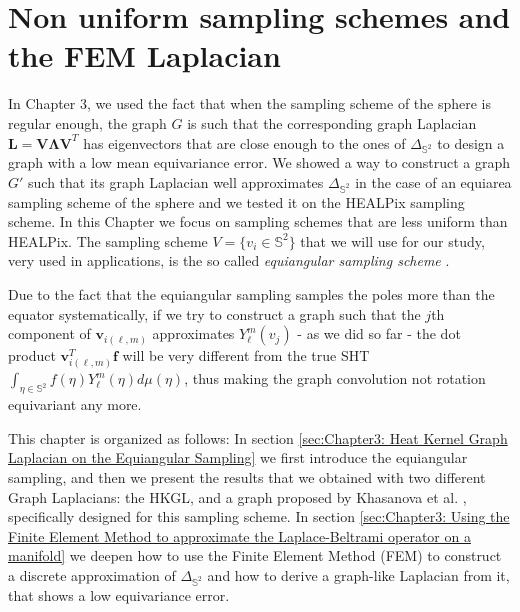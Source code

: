 

\section{Non uniform sampling schemes and the FEM Laplacian}

In Chapter 3, we used the fact that when the sampling scheme of the sphere is regular enough, the graph $G$ is such that the corresponding graph Laplacian $\mathbf {L=V\Lambda V}^T$ has eigenvectors that are close enough to the ones of $\Delta_{\mathbb S^2}$ to design a graph with a low mean equivariance error. We showed a way to construct a graph $G'$ such that its graph Laplacian well approximates $\Delta_{\mathbb S^2}$ in the case of an equiarea sampling scheme of the sphere and we tested it on the HEALPix sampling scheme. In this Chapter we focus on sampling schemes that are less uniform than HEALPix. The sampling scheme $V=\{v_i\in \mathbb S^2\}$ that we will use for our study, very used in applications, is the so called \textit{equiangular sampling scheme} \cite{Driscoll:1994:CFT:184069.184073}. 

\begin{snugshade*}
	 Due to the fact that the equiangular sampling samples the poles more than the equator systematically, if we try to construct a graph such that the $j$th component of $\mathbf v_{i(\ell, m)}$ approximates $ Y_\ell^m(v_j)$ - as we did so far - the dot product $\mathbf v^T_{i(\ell, m)} \mathbf f$ will be very different from the true SHT $\int_{\eta \in \mathbb S^2}f(\eta)Y_\ell^m(\eta)d\mu(\eta)$, thus making the graph convolution not rotation equivariant any more.
\end{snugshade*} 


This chapter is organized as follows: In section \ref{sec:Chapter3: Heat Kernel Graph Laplacian on the Equiangular Sampling} we first introduce the equiangular sampling, and then we present the results that we obtained with two different Graph Laplacians: the HKGL, and a graph proposed by Khasanova et al. \cite{Frossard2017GraphBasedCO}, specifically designed for this sampling scheme. In section \ref{sec:Chapter3: Using the Finite Element Method to approximate the Laplace-Beltrami operator on a manifold} we deepen how to use the Finite Element Method (FEM) to construct a discrete approximation of $\Delta _{\mathbb S^2}$ and how to derive a graph-like Laplacian from it, that shows a low equivariance error.
